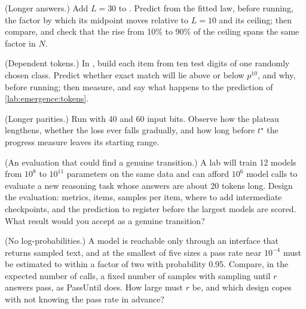 \begin{refsection}
\begin{exercises}
\item \labwork (Longer answers.) Add $L=30$ to . Predict from the fitted law, before running, the factor by which its midpoint moves relative to $L=10$ and its ceiling; then compare, and check that the rise from 10\% to 90\% of the ceiling spans the same factor in $N$.\label{ex:emergence:longer}

\item \labwork (Dependent tokens.) In , build each item from ten test digits of one randomly chosen class. Predict whether exact match will lie above or below $p^{10}$, and why, before running; then measure, and say what happens to the prediction of \cref{lab:emergence:tokens}. \label{ex:emergence:dependent}

\item \labwork (Longer parities.) Run  with 40 and 60 input bits. Observe how the plateau lengthens, whether the loss ever falls gradually, and how long before $t^\star$ the progress measure leaves its starting range.\label{ex:emergence:parity}

\item \design (An evaluation that could find a genuine transition.) A lab will train 12 models from $10^8$ to $10^{11}$ parameters on the same data and can afford $10^6$ model calls to evaluate a new reasoning task whose answers are about 20 tokens long. Design the evaluation: metrics, items, samples per item, where to add intermediate checkpoints, and the prediction to register before the largest models are scored. What result would you accept as a genuine transition?\label{ex:emergence:design1}

\item \design (No log-probabilities.) A model is reachable only through an interface that returns sampled text, and at the smallest of five sizes a pass rate near $10^{-4}$ must be estimated to within a factor of two with probability 0.95. Compare, in the expected number of calls, a fixed number of samples with sampling until $r$ answers pass, as PassUntil does. How large must $r$ be, and which design copes with not knowing the pass rate in advance? \label{ex:emergence:design2}


\end{exercises}
\end{refsection}
